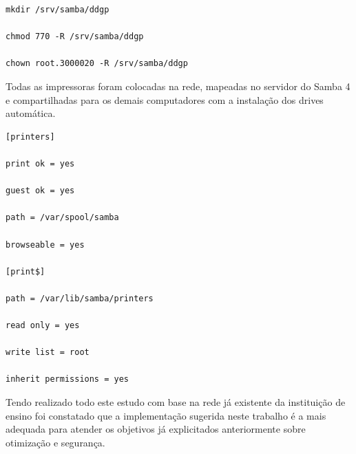 \begin{lstlisting}
mkdir /srv/samba/ddgp

chmod 770 -R /srv/samba/ddgp

chown root.3000020 -R /srv/samba/ddgp
\end{lstlisting}

Todas as impressoras foram colocadas na rede, mapeadas no servidor do Samba 4 e compartilhadas para os demais computadores com a instalação dos drives automática.\\

\begin{lstlisting}
[printers] 

print ok = yes 

guest ok = yes

path = /var/spool/samba 

browseable = yes

[print$] 

path = /var/lib/samba/printers 

read only = yes

write list = root 

inherit permissions = yes
\end{lstlisting}

Tendo realizado todo este estudo com base na rede já existente da instituição de ensino foi constatado que a implementação sugerida neste trabalho é a mais adequada para atender os objetivos já explicitados anteriormente sobre otimização e segurança.
